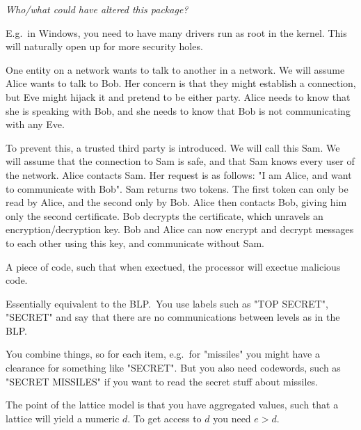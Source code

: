 \begin{definition}[Integrity]
    \textit{Who/what could have altered this package?}
\end{definition}

\begin{definition}
    E.g.\ in Windows, you need to have many drivers run as root in the kernel.
    This will naturally open up for more security holes. 
\end{definition}

\begin{definition}\label{keydistribution}
    One entity on a network wants to talk to another in a network. 
    We will assume Alice wants to talk to Bob.
    Her concern is that they might establish a connection,
    but Eve might hijack it and pretend to be either party. Alice needs to know
    that she is speaking with Bob, and she needs to know that Bob is not 
    communicating with any Eve.

    To prevent this, a trusted third party is introduced. We will call this Sam.
    We will assume that the connection to Sam is safe, and that Sam knows 
    every user of the network.
    Alice contacts Sam. Her request is as follows: "I am Alice, and want to 
    communicate with Bob". Sam returns two tokens. The first token 
    can only be read by Alice, and the second only by Bob. Alice then contacts 
    Bob, giving him only the second certificate. Bob decrypts the certificate,
    which unravels an encryption/decryption key. Bob and Alice can now 
    encrypt and decrypt messages to each other using this key, and communicate
    without Sam.

\end{definition}

\begin{definition}
    A piece of code, such that when exectued, the processor
    will exectue malicious code.
\end{definition}

\begin{definition}
    Essentially equivalent to the BLP.\ You use labels such as "TOP SECRET",
    "SECRET" and say that there are no communications between levels as in the
    BLP.\

    You combine things, so for each item, e.g.\ for "missiles" you might have a
    clearance for something like "SECRET". But you also need codewords, such as
    "SECRET MISSILES" if you want to read the
    secret stuff about missiles.

    The point of the lattice model is that you have aggregated values, such
    that a lattice will yield a numeric $d$. To get access to $d$ you need $e >
    d$.
\end{definition}

